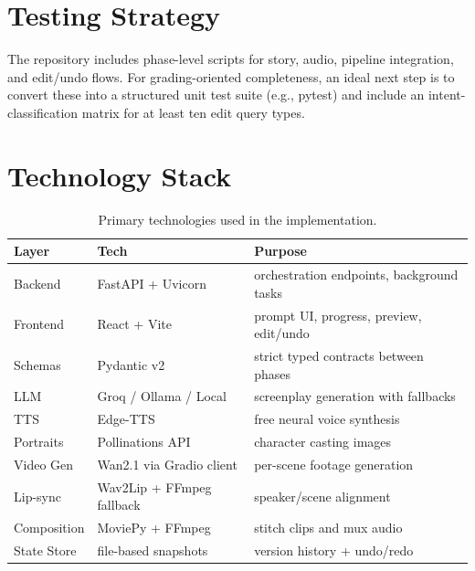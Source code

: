 \documentclass[runningheads]{llncs}
\begin{document}
\section{Testing Strategy}
The repository includes phase-level scripts for story, audio, pipeline integration, and edit/undo flows. For grading-oriented completeness, an ideal next step is to convert these into a structured unit test suite (e.g., pytest) and include an intent-classification matrix for at least ten edit query types.

\section{Technology Stack}
\begin{table}[t]
\centering
\caption{Primary technologies used in the implementation.}
\label{tab:stack}
\begin{tabular}{@{}lll@{}}
\toprule
\textbf{Layer} & \textbf{Tech} & \textbf{Purpose} \\
\midrule
Backend & FastAPI + Uvicorn & orchestration endpoints, background tasks \\
Frontend & React + Vite & prompt UI, progress, preview, edit/undo \\
Schemas & Pydantic v2 & strict typed contracts between phases \\
LLM & Groq / Ollama / Local & screenplay generation with fallbacks \\
TTS & Edge-TTS & free neural voice synthesis \\
Portraits & Pollinations API & character casting images \\
Video Gen & Wan2.1 via Gradio client & per-scene footage generation \\
Lip-sync & Wav2Lip + FFmpeg fallback & speaker/scene alignment \\
Composition & MoviePy + FFmpeg & stitch clips and mux audio \\
State Store & file-based snapshots & version history + undo/redo \\
\bottomrule
\end{tabular}
\end{table}
\end{document}
